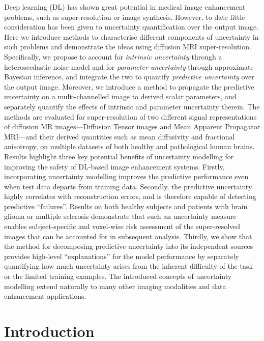 	Deep learning (DL) has shown great potential in medical image enhancement problems, such as super-resolution or image synthesis. However, to date little consideration has been given to uncertainty quantification over the output image. Here we introduce methods to characterise different components of uncertainty in such problems and demonstrate the ideas using diffusion MRI super-resolution.  Specifically, we propose to account for \textit{intrinsic uncertainty} through a heteroscedastic noise model and for \textit{parameter uncertainty} through approximate Bayesian inference, and integrate the two to quantify \textit{predictive uncertainty} over the output image. Moreover, we introduce a method to propagate the predictive uncertainty on a multi-channelled image to derived scalar parameters, and separately quantify the effects of intrinsic and parameter uncertainty therein. The methods are evaluated for super-resolution of two different signal representations of diffusion MR images---Diffusion Tensor images and Mean Apparent Propagator MRI---and their derived quantities such as mean diffusivity and fractional anisotropy, on multiple datasets of both healthy and pathological human brains. Results highlight three key potential benefits of uncertainty modelling for improving the safety of DL-based image enhancement systems. Firstly, incorporating uncertainty modelling improves the predictive performance even when test data departs from training data. Secondly, the predictive uncertainty highly correlates with reconstruction errors, and is therefore capable of detecting predictive ``failures''. Results on both healthy subjects and patients with brain glioma or multiple sclerosis demonstrate that such an uncertainty measure enables subject-specific and voxel-wise risk assessment of the super-resolved images that can be accounted for in subsequent analysis. Thirdly, we show that the method for decomposing predictive uncertainty into its independent sources provides high-level ``explanations'' for the model performance by separately quantifying how much uncertainty arises from the inherent difficulty of the task or the limited training examples. The introduced concepts of uncertainty modelling extend naturally to many other imaging modalities and data enhancement applications.


\section{Introduction}


